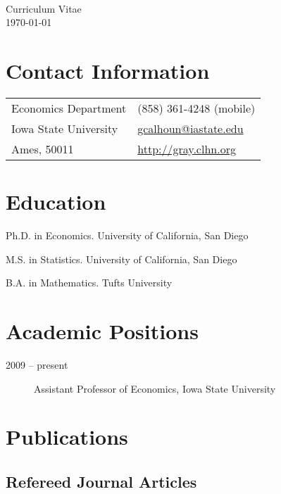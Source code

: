 \documentclass[12pt]{article}%
\newcommand{\allcaps}[1]{\textls{\MakeUppercase{#1}}}
\begin{document}
\RaggedRight

\begin{center}
  \allcaps{\textbf{\large Gray Calhoun}}              \\
  Curriculum Vitae                                    \\
  \today
\end{center}
\section*{Contact Information}
\begin{tabular}{@{}ll@{}}
Economics Department     & (858) 361-4248 (mobile)    \\
Iowa State University    & \url{gcalhoun@iastate.edu} \\
Ames, \allcaps{IA} 50011 & \url{http://gray.clhn.org}
\end{tabular}

\section*{Education}

\begin{description}[noitemsep]
\item[2009] Ph.D. in Economics. University of California, San Diego
\item[2006] M.S. in Statistics. University of California, San Diego
\item[2001] B.A. in Mathematics. Tufts University
\end{description}

\section*{Academic Positions}

\begin{description}
\item[2009 -- present] Assistant Professor of Economics, Iowa State University
\end{description}

\section*{Publications}

\subsection*{Refereed Journal Articles}
\end{document}
